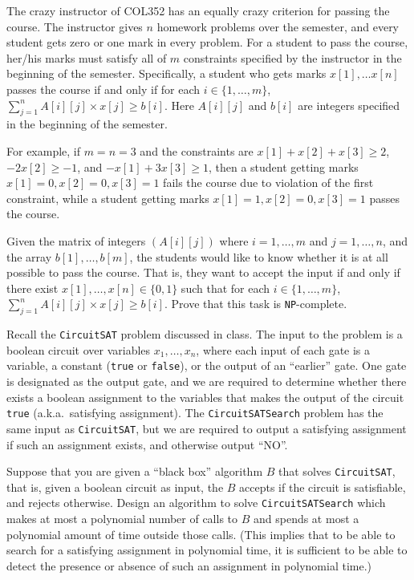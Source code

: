 \documentclass[10pt,addpoints]{exam}
\begin{document}
\begin{prob} The crazy instructor of COL352 has an equally crazy criterion for passing the course. The instructor gives $n$ homework problems over the semester, and every student gets zero or one mark in every problem. For a student to pass the course, her/his marks must satisfy all of $m$ constraints specified by the instructor in the beginning of the semester. Specifically, a student who gets marks $x[1],\ldots x[n]$ passes the course if and only if for each $i\in\{1,\ldots,m\}$, $\sum_{j=1}^n A[i][j]\times x[j]\geq b[i]$. Here $A[i][j]$ and $b[i]$ are integers specified in the beginning of the semester.

For example, if $m=n=3$ and the constraints are $x[1]+x[2]+x[3]\geq2$, $-2x[2]\geq-1$, and $-x[1]+3x[3]\geq1$, then a student getting marks $x[1]=0,x[2]=0,x[3]=1$ fails the course due to violation of the first constraint, while a student getting marks $x[1]=1,x[2]=0,x[3]=1$ passes the course.

Given the matrix of integers $(A[i][j])$ where $i=1,\ldots,m$ and $j=1,\ldots,n$, and the array $b[1],\ldots,b[m]$, the students would like to know whether it is at all possible to pass the course. That is, they want to accept the input if and only if there exist $x[1],\ldots,x[n]\in\{0,1\}$ such that for each $i\in\{1,\ldots,m\}$, $\sum_{j=1}^n A[i][j]\times x[j]\geq b[i]$. Prove that this task is \texttt{NP}-complete.


\end{prob}

\newpage

\begin{prob} Recall the \texttt{CircuitSAT} problem discussed in class. The input to the problem is a boolean circuit over variables $x_1,\ldots,x_n$, where each input of each gate is a variable, a constant (\texttt{true} or \texttt{false}), or the output of an ``earlier'' gate. One gate is designated as the output gate, and we are required to determine whether there exists a boolean assignment to the variables that makes the output of the circuit \texttt{true} (a.k.a.\ satisfying assignment). The \texttt{CircuitSATSearch} problem has the same input as \texttt{CircuitSAT}, but we are required to output a satisfying assignment if such an assignment exists, and otherwise output ``NO''.

Suppose that you are given a ``black box'' algorithm $B$ that solves \texttt{CircuitSAT}, that is, given a boolean circuit as input, the $B$ accepts if the circuit is satisfiable, and rejects otherwise. Design an algorithm to solve \texttt{CircuitSATSearch} which makes at most a polynomial number of calls to $B$ and spends at most a polynomial amount of time outside those calls. (This implies that to be able to search for a satisfying assignment in polynomial time, it is sufficient to be able to detect the presence or absence of such an assignment in polynomial time.)

\end{prob}
\end{document}
